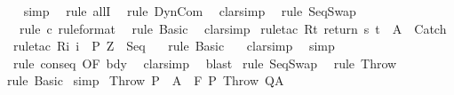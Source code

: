 \begin{isabellebody}
\isamarkupfalse%
\ {}\ \isamarkupfalse%
\ simp\isanewline
{}\isamarkupfalse%
\ \ {\isacharparenleft}rule\ allI{\isacharparenright}\isanewline
{}\isamarkupfalse%
\ \ {\isacharparenleft}rule\ DynCom{\isacharparenright}\isanewline
{}\isamarkupfalse%
\ \ {\isacharparenleft}clarsimp{\isacharparenright}\isanewline
{}\isamarkupfalse%
\ \ {\isacharparenleft}rule\ SeqSwap{\isacharparenright}\isanewline
{}\isamarkupfalse%
\ \ \ {\isacharparenleft}rule\ c\ {\isacharbrackleft}rule{\isacharunderscore}format{\isacharbrackright}{\isacharparenright}\isanewline
{}\isamarkupfalse%
\ \ {\isacharparenleft}rule\ Basic{\isacharparenright}\isanewline
{}\isamarkupfalse%
\ \ clarsimp\isanewline
{}\isamarkupfalse%
\ {\isacharparenleft}rule{\isacharunderscore}tac\ R{\isacharequal}{\isachardoublequoteopen}{\isacharbraceleft}t{\isachardot}\ return\ s\ t\ {\isasymin}\ A{\isacharbraceright}{\isachardoublequoteclose}\ \ Catch{\isacharparenright}\isanewline
{}\isamarkupfalse%
\ \ {\isacharparenleft}rule{\isacharunderscore}tac\ R{\isacharequal}{\isachardoublequoteopen}{\isacharbraceleft}i{\isachardot}\ i\ {\isasymin}\ P{\isacharprime}\ Z{\isacharbraceright}{\isachardoublequoteclose}\ \ Seq{\isacharparenright}\isanewline
{}\isamarkupfalse%
\ \ \ {\isacharparenleft}rule\ Basic{\isacharparenright}\isanewline
{}\isamarkupfalse%
\ \ \ clarsimp\isanewline
{}\isamarkupfalse%
\ \ simp\isanewline
{}\isamarkupfalse%
\ \ {\isacharparenleft}rule\ conseq\ {\isacharbrackleft}OF\ bdy{\isacharbrackright}{\isacharparenright}\isanewline
{}\isamarkupfalse%
\ \ clarsimp\isanewline
{}\isamarkupfalse%
\ \ blast\isanewline
{}\isamarkupfalse%
\ {\isacharparenleft}rule\ SeqSwap{\isacharparenright}\isanewline
{}\isamarkupfalse%
\ \ {\isacharparenleft}rule\ Throw{\isacharparenright}\isanewline
{}\isamarkupfalse%
\ {\isacharparenleft}rule\ Basic{\isacharparenright}\isanewline
{}\isamarkupfalse%
\ simp\isanewline
{}\isamarkupfalse%
%
\endisatagproof
{\isafoldproof}%
%
\isadelimproof
\isanewline
%
\endisadelimproof
\isanewline
{}\isamarkupfalse%
\ Throw{\isacharcolon}\ {\isachardoublequoteopen}P\ {\isasymsubseteq}\ A\ {\isasymLongrightarrow}\ {\isasymGamma}{\isacharcomma}{\isasymTheta}{\isasymturnstile}\isactrlbsub {\isacharslash}F\isactrlesub \ P\ Throw\ Q{\isacharcomma}A{\isachardoublequoteclose}\isanewline

\end{isabellebody}
